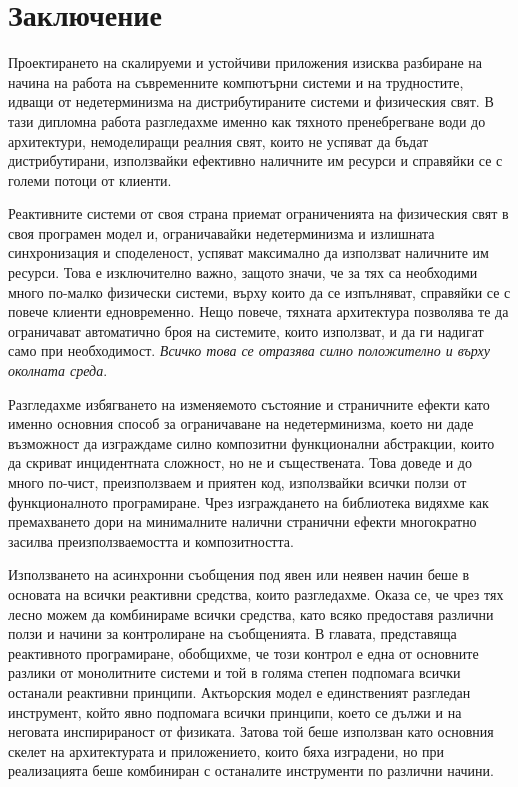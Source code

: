 \chapter{Заключение}
\label{ch:conclusions}

Проектирането на скалируеми и устойчиви приложения изисква разбиране на начина на работа на съвременните компютърни системи и на трудностите, идващи от недетерминизма на дистрибутираните системи и физическия свят. В тази дипломна работа разгледахме именно как тяхното пренебрегване води до архитектури, немоделиращи реалния свят, които не успяват да бъдат дистрибутирани, използвайки ефективно наличните им ресурси и справяйки се с големи потоци от клиенти.

Реактивните системи от своя страна приемат ограниченията на физическия свят в своя програмен модел и, ограничавайки недетерминизма и излишната синхронизация и споделеност, успяват максимално да използват наличните им ресурси. Това е изключително важно, защото значи, че за тях са необходими много по-малко физически системи, върху които да се изпълняват, справяйки се с повече клиенти едновременно. Нещо повече, тяхната архитектура позволява те да ограничават автоматично броя на системите, които използват, и да ги надигат само при необходимост. \emph{Всичко това се отразява силно положително и върху околната среда}.

Разгледахме избягването на изменяемото състояние и страничните ефекти като именно основния способ за ограничаване на недетерминизма, което ни даде възможност да изграждаме силно композитни функционални абстракции, които да скриват инцидентната сложност, но не и съществената. Това доведе и до много по-чист, преизползваем и приятен код, използвайки всички ползи от функционалното програмиране. Чрез изграждането на  библиотека видяхме как премахването дори на минималните налични странични ефекти многократно засилва преизползваемостта и композитността.

Използването на асинхронни съобщения под явен или неявен начин беше в основата на всички реактивни средства, които разгледахме. Оказа се, че чрез тях лесно можем да комбинираме всички средства, като всяко предоставя различни ползи и начини за контролиране на съобщенията. В главата, представяща реактивното програмиране, обобщихме, че този контрол е една от основните разлики от монолитните системи и той в голяма степен подпомага всички останали реактивни принципи. Актьорския модел е единственият разгледан инструмент, който явно подпомага всички принципи, което се дължи и на неговата инспирираност от физиката. Затова той беше използван като основния скелет на архитектурата и приложението, които бяха изградени, но при реализацията беше комбиниран с останалите инструменти по различни начини.

